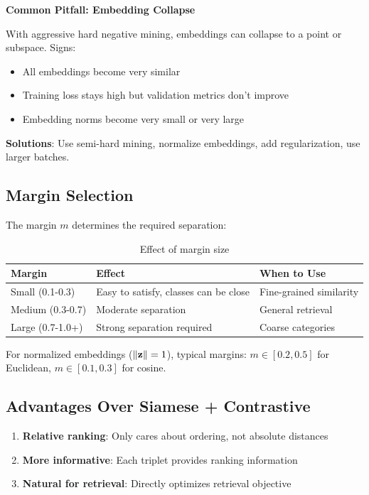 \begin{warningbox}
\textbf{Common Pitfall: Embedding Collapse}

With aggressive hard negative mining, embeddings can collapse to a point or subspace. Signs:
\begin{itemize}
    \item All embeddings become very similar
    \item Training loss stays high but validation metrics don't improve
    \item Embedding norms become very small or very large
\end{itemize}

\textbf{Solutions}: Use semi-hard mining, normalize embeddings, add regularization, use larger batches.
\end{warningbox}

\subsection{Margin Selection}

The margin $m$ determines the required separation:

\begin{table}[H]
\centering
\caption{Effect of margin size}
\begin{tabularx}{\textwidth}{lXX}
\toprule
\textbf{Margin} & \textbf{Effect} & \textbf{When to Use} \\
\midrule
Small (0.1-0.3) & Easy to satisfy, classes can be close & Fine-grained similarity \\
Medium (0.3-0.7) & Moderate separation & General retrieval \\
Large (0.7-1.0+) & Strong separation required & Coarse categories \\
\bottomrule
\end{tabularx}
\end{table}

For normalized embeddings ($\|\mathbf{z}\| = 1$), typical margins: $m \in [0.2, 0.5]$ for Euclidean, $m \in [0.1, 0.3]$ for cosine.

\subsection{Advantages Over Siamese + Contrastive}

\begin{enumerate}
    \item \textbf{Relative ranking}: Only cares about ordering, not absolute distances
    \item \textbf{More informative}: Each triplet provides ranking information
    \item \textbf{Natural for retrieval}: Directly optimizes retrieval objective
\end{enumerate}

